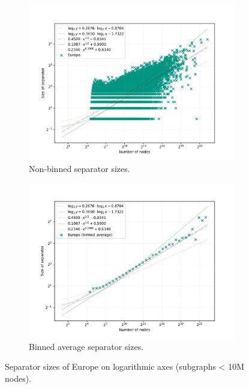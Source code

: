 \begin{figure}[tbhp]
	\begin{subfigure}{0.49\linewidth}
		\centering
		\includegraphics[width=\linewidth]{graphics/Europe_non_binned.png}
		\caption{Non-binned separator sizes.}
		\label{fig:separator_size_loglog_non_binned}
	\end{subfigure}
	\hfill
	\begin{subfigure}{0.49\linewidth}
		\centering
		\includegraphics[width=\linewidth]{graphics/Europe-binned.pdf}
		\caption{Binned average separator sizes.}
		\label{fig:separator_size_loglog_binned}
	\end{subfigure}
	\caption{Separator sizes of Europe on logarithmic axes (subgraphs < 10M nodes).}
	\label{fig:separator_size_loglog}
\end{figure}

